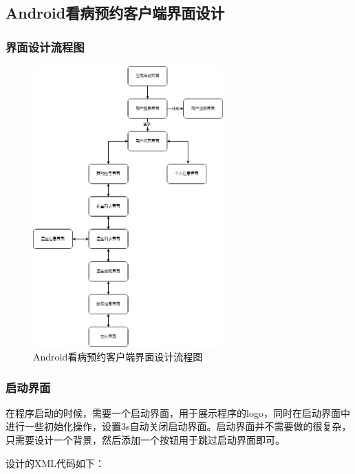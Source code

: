 \documentclass[UTF8,12pt]{article}
\begin{document}
\subsection{Android看病预约客户端界面设计}
\subsubsection{界面设计流程图}
\begin{figure}[htbp]
    \centering
    \includegraphics[width=0.65\textwidth]{imgs/3.png}
    \caption{Android看病预约客户端界面设计流程图}
\end{figure}

\newpage

\subsubsection{启动界面}
在程序启动的时候，需要一个启动界面，用于展示程序的logo，同时在启动界面中进行一些初始化操作，设置3s自动关闭启动界面。启动界面并不需要做的很复杂，只需要设计一个背景，然后添加一个按钮用于跳过启动界面即可。

设计的XML代码如下：
\end{document}
